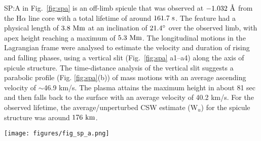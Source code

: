 %
SP:A in Fig.~\ref{fig:spa} is an off-limb spicule that was observed at $-1.032~\textup{\AA}$ from the H$\alpha$ line core with a total lifetime of around $161.7~\rm{s}$. The feature had a physical length of $3.8~\rm{Mm}$ at an inclination of $21.4^{\circ}$ over the observed limb, with apex height reaching a maximum of $5.3~\rm{Mm}$. The longitudinal motions in the Lagrangian frame were analysed to estimate the velocity and duration of rising and falling phases, using a vertical slit (Fig.~\ref{fig:spa} a1–a4) along the axis of spicule structure. The time-distance analysis of the vertical slit suggests a parabolic profile (Fig. \ref{fig:spa}(b)) of mass motions with an average ascending velocity of $\sim$46.9 km/s. The plasma attains the maximum height in about 81 sec and then falls back to the surface with an average velocity of 40.2 km/s. For the observed lifetime, the average/unperturbed CSW estimate (W$_{u}$) for the spicule structure was around $176~\rm{km}$.
\begin{figure*}
\texttt{[image: figures/fig\_sp\_a.png]}
\caption{Panels (a1) – (a4) show the temporal evolution of candidate spicule feature (SP:A) in the H$\alpha$ passband at four instances, with positions of vertical (cyan) and horizontal (yellow) slits used for the estimation of field-aligned mass flows and CSW respectively. Panel (b) shows the time-distance plot from the vertical slit on the spicule, highlighting the rise- and fall-phases of field-aligned mass flow. The maximum height attained by the visible plasma is marked with the ‘+’ symbol, along with estimated velocities (46.9 km/s, 40.25 km/s). Bottom panel (c) shows an example of Gaussian fit for intensity magnitudes for horizontal slit location (marked as a yellow line on (a1) – (a4)), with error bars, denoting the standard deviation for intensity values. The vertical black line marks the position of the amplitude of Gaussian fit, while shaded-regions mark average/unperturbed width (W$_{u}$) during spicule lifetime and perturbed/instantaneous width (W). This figure is taken from \cite{Dover2020ApJ90572D} and was produced by Dr. Sharma.}
\label{fig:spa} 
\end{figure*}
